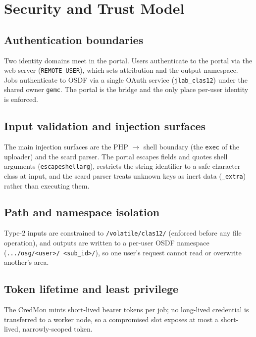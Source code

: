 \section{Security and Trust Model}\label{ch:16}

\subsection{Authentication boundaries}

Two identity domains meet in the portal. Users authenticate to the portal via the web server
(\texttt{REMOTE\_\allowbreak{}USER}), which sets attribution and the output namespace. Jobs authenticate to
OSDF via a single OAuth service (\texttt{jlab\_\allowbreak{}clas12}) under the shared owner \texttt{gemc}. The
portal is the bridge and the only place per-user identity is enforced.

\subsection{Input validation and injection surfaces}

The main injection surfaces are the PHP $\rightarrow$ shell boundary (the \texttt{exec} of the uploader) and
the scard parser. The portal escapes fields and quotes shell arguments (\texttt{escapeshellarg}), restricts the
string identifier to a safe character class at input, and the scard parser treats unknown keys as inert data
(\texttt{\_\allowbreak{}extra}) rather than executing them.

\subsection{Path and namespace isolation}

Type-2 inputs are constrained to \texttt{/\allowbreak{}volatile/\allowbreak{}clas12/\allowbreak{}} (enforced
before any file operation), and outputs are written to a per-user OSDF namespace
(\texttt{.\allowbreak{}.\allowbreak{}.\allowbreak{}/\allowbreak{}osg/\allowbreak{}<user>/\allowbreak{}%
<sub\_\allowbreak{}id>/\allowbreak{}}), so one user's request cannot read or overwrite another's area.

\subsection{Token lifetime and least privilege}

The CredMon mints short-lived bearer tokens per job; no long-lived credential is transferred to a worker node,
so a compromised slot exposes at most a short-lived, narrowly-scoped token.
